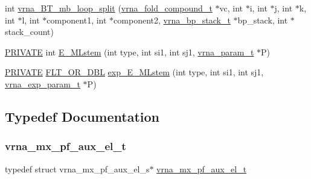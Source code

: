 \begin{DoxyCompactItemize}
\item 
int \mbox{\hyperlink{group__loops_ga08245ee149f137d6665ef2bdfcc066a7}{vrna\+\_\+\+B\+T\+\_\+mb\+\_\+loop\+\_\+split}} (\mbox{\hyperlink{group__fold__compound_ga1b0cef17fd40466cef5968eaeeff6166}{vrna\+\_\+fold\+\_\+compound\+\_\+t}} $\ast$vc, int $\ast$i, int $\ast$j, int $\ast$k, int $\ast$l, int $\ast$component1, int $\ast$component2, \mbox{\hyperlink{group__data__structures_gaa651bda42e7692f08cb603cd6834b0ee}{vrna\+\_\+bp\+\_\+stack\+\_\+t}} $\ast$bp\+\_\+stack, int $\ast$stack\+\_\+count)
\item 
\mbox{\hyperlink{group__utils_ga5e151c615eda34903514212f05a5ccf8}{P\+R\+I\+V\+A\+TE}} int \mbox{\hyperlink{group__loops_ga24f7234dbe63dab516e7ea993a3e9f2c}{E\+\_\+\+M\+Lstem}} (int type, int si1, int sj1, \mbox{\hyperlink{group__energy__parameters_ga8a69ca7d787e4fd6079914f5343a1f35}{vrna\+\_\+param\+\_\+t}} $\ast$P)
\item 
\mbox{\hyperlink{group__utils_ga5e151c615eda34903514212f05a5ccf8}{P\+R\+I\+V\+A\+TE}} \mbox{\hyperlink{group__data__structures_ga31125aeace516926bf7f251f759b6126}{F\+L\+T\+\_\+\+O\+R\+\_\+\+D\+BL}} \mbox{\hyperlink{group__loops_gaeb3cb71cfa2fcc27f9f3da1d51e093ec}{exp\+\_\+\+E\+\_\+\+M\+Lstem}} (int type, int si1, int sj1, \mbox{\hyperlink{group__energy__parameters_ga01d8b92fe734df8d79a6169482c7d8d8}{vrna\+\_\+exp\+\_\+param\+\_\+t}} $\ast$P)
\end{DoxyCompactItemize}


\subsection{Typedef Documentation}
\mbox{\label{group__loops_gaf9d5160c11ffad3ec258124a77fee13c}} 
\subsubsection{\texorpdfstring{vrna\+\_\+mx\+\_\+pf\+\_\+aux\+\_\+el\+\_\+t}{vrna\_mx\_pf\_aux\_el\_t}}
{\footnotesize\ttfamily typedef struct vrna\+\_\+mx\+\_\+pf\+\_\+aux\+\_\+el\+\_\+s$\ast$ \mbox{\hyperlink{group__loops_gaf9d5160c11ffad3ec258124a77fee13c}{vrna\+\_\+mx\+\_\+pf\+\_\+aux\+\_\+el\+\_\+t}}}



